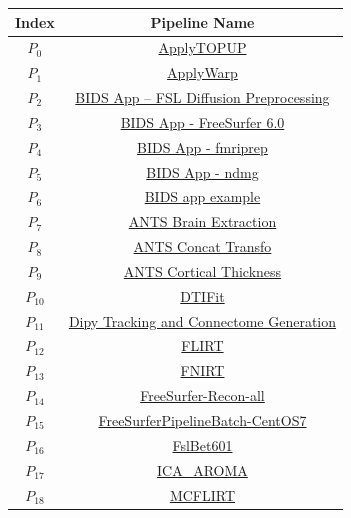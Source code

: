 \begin{table}
    \centering
    \begin{tabular}{cc}
        \hline
        Index & Pipeline Name  \\
        \hline 
        $P_{0}$ & \href{https://doi.org/10.5281/zenodo.2621487}{ApplyTOPUP} \\
        $P_{1}$ & \href{https://doi.org/10.5281/zenodo.2650440}{ApplyWarp}\\
        $P_{2}$ & \href{https://doi.org/10.5281/zenodo.2566455}{BIDS App -- FSL Diffusion Preprocessing}\\
        $P_{3}$ & \href{https://doi.org/10.5281/zenodo.1484547}{BIDS App - FreeSurfer 6.0}\\
        $P_{4}$ & \href{https://doi.org/10.5281/zenodo.1895219}{BIDS App - fmriprep}\\
        $P_{5}$ & \href{https://doi.org/10.5281/zenodo.4457865}{BIDS App - ndmg}\\
        $P_{6}$ & \href{https://doi.org/10.5281/zenodo.1451001}{BIDS app example}\\
        $P_{7}$ & \href{https://doi.org/10.5281/zenodo.2636973}{ANTS Brain Extraction}\\
        $P_{8}$ & \href{https://doi.org/10.5281/zenodo.2640953}{ANTS Concat Transfo}\\
        $P_{9}$ & \href{https://doi.org/10.5281/zenodo.2634608}{ANTS Cortical Thickness}\\
        $P_{10}$ & \href{https://doi.org/10.5281/zenodo.2601876}{DTIFit}\\
        $P_{11}$ & \href{https://doi.org/10.5281/zenodo.3699595}{Dipy Tracking and Connectome Generation}\\
        $P_{12}$ & \href{https://doi.org/10.5281/zenodo.2597643}{FLIRT}	\\
        $P_{13}$ & \href{https://doi.org/10.5281/zenodo.2639849}{FNIRT}	\\
        $P_{14}$ & \href{https://doi.org/10.5281/zenodo.4043546}{FreeSurfer-Recon-all}\\
        $P_{15}$ & \href{https://doi.org/10.5281/zenodo.1450997}{FreeSurferPipelineBatch-CentOS7}\\
        $P_{16}$ & \href{https://doi.org/10.5281/zenodo.3267250}{FslBet601}	\\
        $P_{17}$ & \href{https://doi.org/10.5281/zenodo.1445789}{ICA\_AROMA}	\\
        $P_{18}$ & \href{https://doi.org/10.5281/zenodo.2602109}{MCFLIRT}	\\

\end{tabular}
\end{table}
